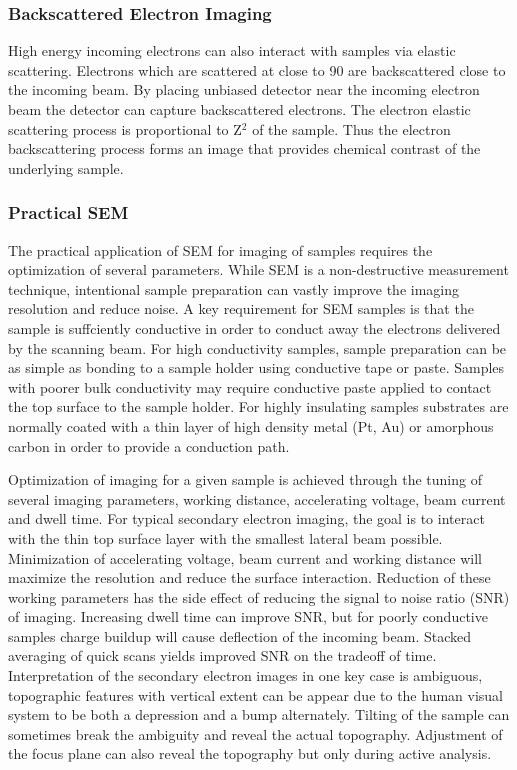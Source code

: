 \subsubsection{Backscattered Electron Imaging}
High energy incoming electrons can also interact with samples via elastic scattering. Electrons which are scattered at close to 90\degree{} are backscattered close to the incoming beam. By placing unbiased detector near the incoming electron beam the detector can capture backscattered electrons. The electron elastic scattering process is proportional to Z$^2$ of the sample. Thus the electron backscattering process forms an image that provides chemical contrast of the underlying sample.

\subsubsection{Practical SEM}
The practical application of SEM for imaging of samples requires the optimization of several parameters. While SEM is a non-destructive measurement technique, intentional sample preparation can vastly improve the imaging resolution and reduce noise. A key requirement for SEM samples is that the sample is suffciently conductive in order to conduct away the electrons delivered by the scanning beam. For high conductivity samples, sample preparation can be as simple as bonding to a sample holder using conductive tape or paste. Samples with poorer bulk conductivity may require conductive paste applied to contact the top surface to the sample holder. For highly insulating samples substrates are normally coated with a thin layer of high density metal (Pt, Au) or amorphous carbon in order to provide a conduction path.

Optimization of imaging for a given sample is achieved through the tuning of several imaging parameters, working distance, accelerating voltage, beam current and dwell time. For typical secondary electron imaging, the goal is to interact with the thin top surface layer with the smallest lateral beam possible. Minimization of accelerating voltage, beam current and working distance will maximize the resolution and reduce the surface interaction. Reduction of these working parameters has the side effect of reducing the signal to noise ratio (SNR) of imaging. Increasing dwell time can improve SNR, but for poorly conductive samples charge buildup will cause deflection of the incoming beam. Stacked averaging of quick scans yields improved SNR on the tradeoff of time. Interpretation of the secondary electron images in one key case is ambiguous, topographic features with vertical extent can be appear due to the human visual system to be both a depression and a bump alternately. Tilting of the sample can sometimes break the ambiguity and reveal the actual topography. Adjustment of the focus plane can also reveal the topography but only during active analysis.

